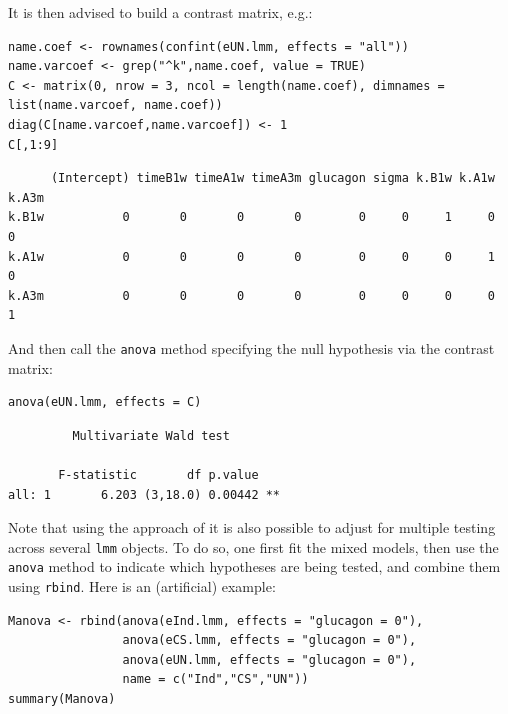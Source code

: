 \documentclass[12pt]{article}
\begin{document}
It is then advised to build a contrast matrix, e.g.:
\lstset{language=r,label= ,caption= ,captionpos=b,numbers=none}
\begin{lstlisting}
name.coef <- rownames(confint(eUN.lmm, effects = "all"))
name.varcoef <- grep("^k",name.coef, value = TRUE)
C <- matrix(0, nrow = 3, ncol = length(name.coef), dimnames = list(name.varcoef, name.coef))
diag(C[name.varcoef,name.varcoef]) <- 1
C[,1:9]
\end{lstlisting}

\begin{verbatim}
      (Intercept) timeB1w timeA1w timeA3m glucagon sigma k.B1w k.A1w k.A3m
k.B1w           0       0       0       0        0     0     1     0     0
k.A1w           0       0       0       0        0     0     0     1     0
k.A3m           0       0       0       0        0     0     0     0     1
\end{verbatim}


And then call the \texttt{anova} method specifying the null hypothesis via the
contrast matrix:
\lstset{language=r,label= ,caption= ,captionpos=b,numbers=none}
\begin{lstlisting}
anova(eUN.lmm, effects = C)
\end{lstlisting}

\begin{verbatim}
	     Multivariate Wald test 

       F-statistic       df p.value   
all: 1       6.203 (3,18.0) 0.00442 **
\end{verbatim}


Note that using the approach of \cite{pipper2012versatile} it is also
possible to adjust for multiple testing across several \texttt{lmm}
objects. To do so, one first fit the mixed models, then use the
\texttt{anova} method to indicate which hypotheses are being tested, and
combine them using \texttt{rbind}. Here is an (artificial) example:
\lstset{language=r,label= ,caption= ,captionpos=b,numbers=none}
\begin{lstlisting}
Manova <- rbind(anova(eInd.lmm, effects = "glucagon = 0"),
                anova(eCS.lmm, effects = "glucagon = 0"),
                anova(eUN.lmm, effects = "glucagon = 0"),
                name = c("Ind","CS","UN"))
summary(Manova) 
\end{lstlisting}
\end{document}
